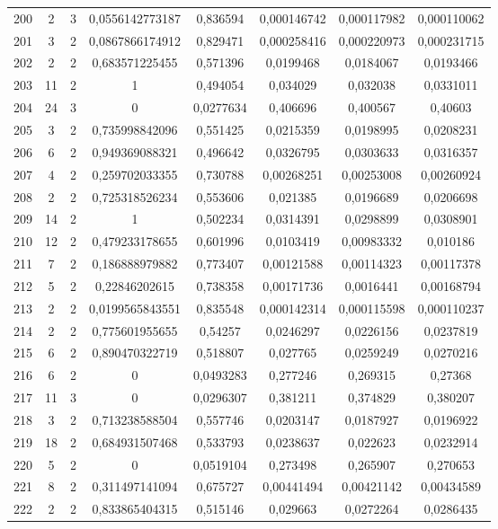 \begin{longtable}{|c|c|c|c|c|c|c|c|}
200 & 2 & 3 & 0,0556142773187 & 0,836594 & 0,000146742 & 0,000117982 & 0,000110062  \\
201 & 3 & 2 & 0,0867866174912 & 0,829471 & 0,000258416 & 0,000220973 & 0,000231715  \\
202 & 2 & 2 & 0,683571225455 & 0,571396 & 0,0199468 & 0,0184067 & 0,0193466  \\
203 & 11 & 2 & 1 & 0,494054 & 0,034029 & 0,032038 & 0,0331011  \\
204 & 24 & 3 & 0 & 0,0277634 & 0,406696 & 0,400567 & 0,40603  \\
205 & 3 & 2 & 0,735998842096 & 0,551425 & 0,0215359 & 0,0198995 & 0,0208231  \\
206 & 6 & 2 & 0,949369088321 & 0,496642 & 0,0326795 & 0,0303633 & 0,0316357  \\
207 & 4 & 2 & 0,259702033355 & 0,730788 & 0,00268251 & 0,00253008 & 0,00260924  \\
208 & 2 & 2 & 0,725318526234 & 0,553606 & 0,021385 & 0,0196689 & 0,0206698  \\
209 & 14 & 2 & 1 & 0,502234 & 0,0314391 & 0,0298899 & 0,0308901  \\
210 & 12 & 2 & 0,479233178655 & 0,601996 & 0,0103419 & 0,00983332 & 0,010186  \\
211 & 7 & 2 & 0,186888979882 & 0,773407 & 0,00121588 & 0,00114323 & 0,00117378  \\
212 & 5 & 2 & 0,22846202615 & 0,738358 & 0,00171736 & 0,0016441 & 0,00168794  \\
213 & 2 & 2 & 0,0199565843551 & 0,835548 & 0,000142314 & 0,000115598 & 0,000110237  \\
214 & 2 & 2 & 0,775601955655 & 0,54257 & 0,0246297 & 0,0226156 & 0,0237819  \\
215 & 6 & 2 & 0,890470322719 & 0,518807 & 0,027765 & 0,0259249 & 0,0270216  \\
216 & 6 & 2 & 0 & 0,0493283 & 0,277246 & 0,269315 & 0,27368  \\
217 & 11 & 3 & 0 & 0,0296307 & 0,381211 & 0,374829 & 0,380207  \\
218 & 3 & 2 & 0,713238588504 & 0,557746 & 0,0203147 & 0,0187927 & 0,0196922  \\
219 & 18 & 2 & 0,684931507468 & 0,533793 & 0,0238637 & 0,022623 & 0,0232914  \\
220 & 5 & 2 & 0 & 0,0519104 & 0,273498 & 0,265907 & 0,270653  \\
221 & 8 & 2 & 0,311497141094 & 0,675727 & 0,00441494 & 0,00421142 & 0,00434589  \\
222 & 2 & 2 & 0,833865404315 & 0,515146 & 0,029663 & 0,0272264 & 0,0286435  \\

\end{longtable}

